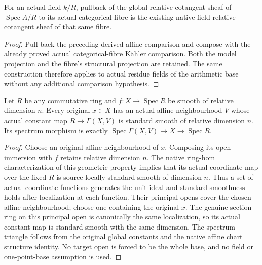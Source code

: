 \begin{theorem}
\label{thm:kn-arithmetic-global-affine-cotangent-fibre}
\leanok
{}
For an actual field $k/R$, pullback of the global relative cotangent sheaf
of $\operatorname{Spec}A/R$ to its actual categorical fibre is the existing
native field-relative cotangent sheaf of that same fibre.
\end{theorem}
\begin{proof}
Pull back the preceding derived affine comparison and compose with the
already proved actual categorical-fibre K\"ahler comparison.  Both the model
projection and the fibre's structural projection are retained.  The same
construction therefore applies to actual residue fields of the arithmetic
base without any additional comparison hypothesis.
\end{proof}

\begin{theorem}
\label{thm:kn-arithmetic-fixed-base-standard-charts}
\leanok
{}
Let $R$ be any commutative ring and $f:X\to\operatorname{Spec}R$ be smooth of
relative dimension $n$.  Every original $x\in X$ has an actual affine
neighbourhood $V$ whose actual constant map $R\to\Gamma(X,V)$ is standard
smooth of relative dimension $n$.  Its spectrum morphism is exactly
$\operatorname{Spec}\Gamma(X,V)\to X\to\operatorname{Spec}R$.
\end{theorem}
\begin{proof}
Choose an original affine neighbourhood of $x$.  Composing its open immersion
with $f$ retains relative dimension $n$.  The native ring-hom characterization
of this geometric property implies that its actual coordinate map over the
fixed $R$ is source-locally standard smooth of dimension $n$.  Thus a set of
actual coordinate functions generates the unit ideal and standard smoothness
holds after localization at each function.  Their principal opens cover the
chosen affine neighbourhood; choose one containing the original $x$.
The genuine section ring on this principal open is canonically the same
localization, so its actual constant map is standard smooth with the same
dimension.  The spectrum triangle follows from the original global constants
and the native affine chart structure identity.  No target open is forced to
be the whole base, and no field or one-point-base assumption is used.
\end{proof}

